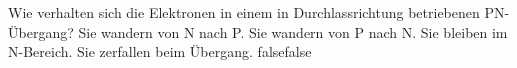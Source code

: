     {Wie verhalten sich die Elektronen in einem in Durchlassrichtung betriebenen PN-Übergang?}
    {Sie wandern von N nach P.}
    {Sie wandern von P nach N.}
    {Sie bleiben im N-Bereich.}
    {Sie zerfallen beim Übergang.}
    {false}{false}